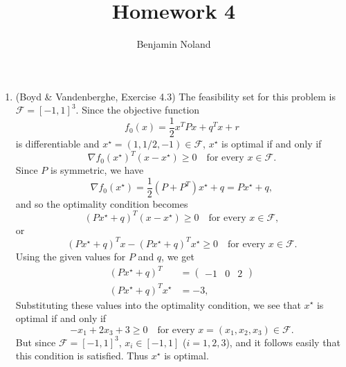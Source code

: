 \documentclass[letterpaper,12pt]{article}
\title{Homework 4}
\author{Benjamin Noland}
\date{}
\begin{document}
\maketitle

\begin{enumerate}
\item (Boyd \& Vandenberghe, Exercise 4.3) The feasibility set for
  this problem is $\mathcal{F} = [-1, 1]^3$. Since the objective
  function
  \begin{equation*}
    f_0(x) = \frac{1}{2} x^T P x + q^T x + r
  \end{equation*}
  is differentiable and $x^\star = (1, 1/2, -1) \in \mathcal{F}$,
  $x^\star$ is optimal if and only if
  \begin{equation*}
    \nabla f_0(x^\star)^T (x - x^\star) \geq 0
      \quad \text{for every $x \in \mathcal{F}$}.
  \end{equation*}
  Since $P$ is symmetric, we have
  \begin{equation*}
    \nabla f_0(x^\star) = \frac{1}{2} (P + P^T) x^\star + q = Px^\star + q,
  \end{equation*}
  and so the optimality condition becomes
  \begin{equation*}
    \left( Px^\star + q \right)^T (x - x^\star) \geq 0
      \quad \text{for every $x \in \mathcal{F}$},
  \end{equation*}
  or
  \begin{equation*}
    \left( Px^\star + q \right)^T x
      - \left( Px^\star + q \right)^T x^\star \geq 0
      \quad \text{for every $x \in \mathcal{F}$}.
  \end{equation*}
  Using the given values for $P$ and $q$, we get
  \begin{align*}
    \left( Px^\star + q \right)^T
      &= \begin{pmatrix}
           -1 & 0 & 2
         \end{pmatrix} \\
    \left( Px^\star + q \right)^T x^\star &= -3,
  \end{align*}
  Substituting these values into the optimality condition, we see that
  $x^\star$ is optimal if and only if
  \begin{equation*}
    -x_1 + 2x_3 + 3 \geq 0
      \quad \text{for every $x = (x_1, x_2, x_3) \in \mathcal{F}$}.
  \end{equation*}
  But since $\mathcal{F} = [-1, 1]^3$, $x_i \in [-1, 1]$
  ($i = 1, 2, 3$), and it follows easily that this condition is
  satisfied. Thus $x^\star$ is optimal.


\end{enumerate}
\end{document}
